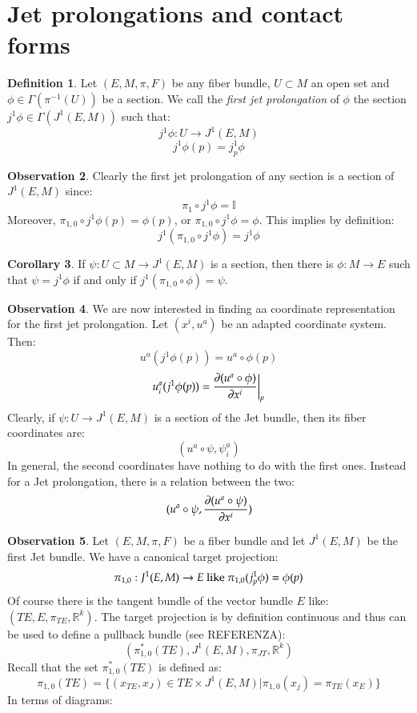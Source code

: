 \documentclass[12pt,a4paper]{report}
\theoremstyle{definition}
\newtheorem{Def}{Definition}[chapter]
\theoremstyle{Theorem}
\theoremstyle{break}
\theoremstyle{definition}
\newtheorem{Cor}[Def]{Corollary}
\newtheorem{Obs}[Def]{Observation}
\begin{document}
	\section{Jet prolongations and contact forms}
	\begin{Def}
		Let $(E,M,\pi,F)$ be any fiber bundle, $U\subset M$ an open set and $\phi\in\Gamma(\pi^{-1}(U))$ be a section. We call the \textit{first jet prolongation} of $\phi$ the section $j^1\phi\in\Gamma(J^1(E,M))$ such that:
		$$j^1\phi:U\rightarrow J^1(E,M)$$
		$$j^1\phi(p)=j^1_p\phi$$
	\end{Def}
	\begin{Obs}
		Clearly the first jet prolongation of any section is a section of $J^1(E,M)$ since:
		$$\pi_1\circ j^1\phi=\mathbb{I}$$
		Moreover, $\pi_{1,0}\circ j^1\phi(p)=\phi(p)$, or $\pi_{1,0}\circ j^1\phi=\phi$. This implies by definition:
		$$j^1(\pi_{1,0}\circ j^1\phi)=j^1\phi$$
	\end{Obs}
	\begin{Cor}
		If $\psi:U\subset M\rightarrow J^1(E,M)$ is a section, then there is $\phi:M\rightarrow E$ such that $\psi=j^1\phi$ if and only if $j^1(\pi_{1,0}\circ \phi)=\psi$.
	\end{Cor}
	\begin{Obs}
		We are now interested in finding aa coordinate representation for the first jet prolongation. Let $(x^i,u^a)$ be an adapted coordinate system. Then:
		$$u^a(j^1\phi(p))=u^a\circ \phi (p)$$
		$$u_i^a(j^1\phi(p))={\partial (u^a\circ \phi)\over \partial x^i}\bigg|_p$$
		Clearly, if $\psi:U\rightarrow J^1(E,M)$ is a section of the Jet bundle, then its fiber coordinates are:
		$$(u^a\circ \psi,\psi^a_i)$$
		In general, the second coordinates have nothing to do with the first ones. Instead for a Jet prolongation, there is a relation between the two:
		$$(u^a\circ \psi,{\partial (u^a\circ \psi)\over \partial x^i})$$
	\end{Obs}
	\begin{Obs}
		Let $(E,M,\pi,F)$ be a fiber bundle and let $J^1(E,M)$ be the first Jet bundle. We have a canonical target projection:
		$$\pi_{1,0}:J^1(E,M)\rightarrow E\hbox{ like } \pi_{1,0}(j^1_p\phi)=\phi(p)$$
		Of course there is the tangent bundle of the vector bundle $E$ like: $(TE,E,\pi_{TE},\mathbb{R}^k)$.
		The target projection is by definition continuous and thus can be used to define a pullback bundle (see REFERENZA):
		$$(\pi_{1,0}^*(TE),J^1(E,M),\pi_{JT},\mathbb{R}^{k})$$
		Recall that the set $\pi_{1,0}^*(TE)$ is defined as:
		$$\pi_{1,0}(TE)=\bigg\{(x_{TE},x_J)\in TE\times J^1(E,M)\bigg|\pi_{1,0}(x_j)=\pi_{TE}(x_E)\bigg\}$$
		In terms of diagrams:
		\begin{center}
		\end{center}
	\end{Obs}
\end{document}
